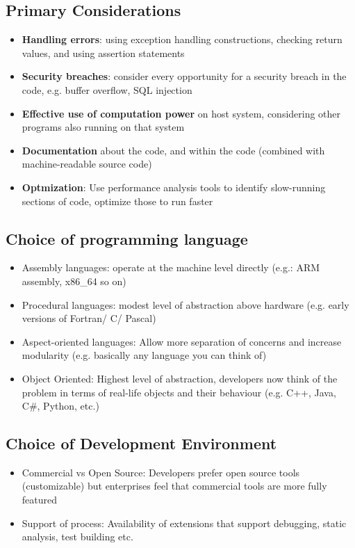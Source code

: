 \documentclass{article}
\begin{document}
\subsection{Primary Considerations}
\begin{itemize}
    \item \textbf{Handling errors}: using exception handling constructions, checking return values, and using assertion statements
    
    \item \textbf{Security breaches}: consider every opportunity for a security breach in the code, e.g. buffer overflow, SQL injection
    
    \item \textbf{Effective use of computation power} on host system, considering other programs also running on that system
    
    \item \textbf{Documentation} about the code, and within the code (combined with machine-readable source code)
    
    \item \textbf{Optmization}: Use performance analysis tools to identify slow-running sections of code, optimize those to run faster
\end{itemize}
\subsection{Choice of programming language}
\begin{itemize}
    \item Assembly languages: operate at the machine level directly (e.g.: ARM assembly, x86\_64 so on)
    
    \item Procedural languages: modest level of abstraction above hardware (e.g. early versions of Fortran/ C/ Pascal)
    
    \item Aspect-oriented languages: Allow more separation of concerns and increase modularity (e.g. basically any language you can think of)
    
    \item Object Oriented: Highest level of abstraction, developers now think of the problem in terms of real-life objects and their behaviour (e.g. C++, Java, C\#, Python, etc.)
\end{itemize}

\subsection{Choice of Development Environment}
\begin{itemize}
    \item Commercial vs Open Source: Developers prefer open source tools (customizable) but enterprises feel that commercial tools are more fully featured
    
    \item Support of process: Availability of extensions that support debugging, static analysis, test building etc.
\end{itemize}
\end{document}
